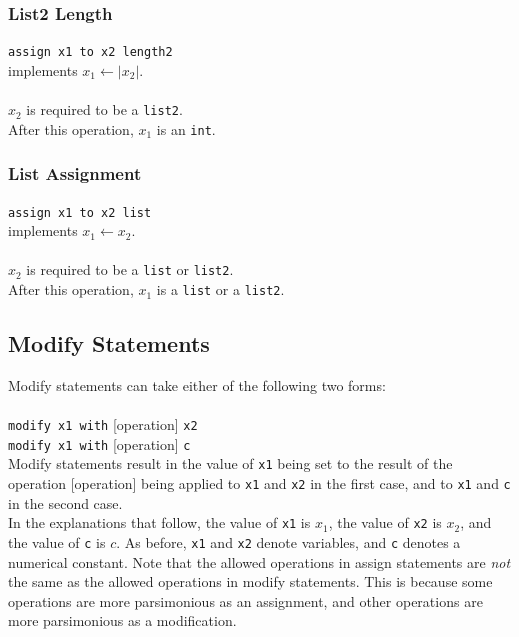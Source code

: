 \documentclass[11pt]{report}
\begin{document}
\subsubsection{List2 Length} 

\texttt{assign x1 to x2 length2} \\
implements $x_1 \leftarrow |x_2|$. \\ \\  
$x_2$ is required to be a \texttt{list2}. \\
After this operation, $x_1$ is an \texttt{int}.

\subsubsection{List Assignment}

\texttt{assign x1 to x2 list} \\
implements $x_1 \leftarrow x_2$. \\ \\  
$x_2$ is required to be a \texttt{list} or \texttt{list2}. \\
After this operation, $x_1$ is a \texttt{list} or a \texttt{list2}.

\subsection{Modify Statements}

Modify statements can take either of the following two forms: \\ \\
\texttt{modify x1 with} [operation] \texttt{x2} \\ 
\texttt{modify x1 with} [operation] \texttt{c} \\

Modify statements result in the value of \texttt{x1} being set to the result of the operation [operation] being applied to \texttt{x1} and \texttt{x2} in the first case, and to \texttt{x1} and \texttt{c} in the second case. \\

In the explanations that follow, the value of \texttt{x1} is $x_1$, the value of \texttt{x2} is $x_2$, and the value of \texttt{c} is $c$. As before, \texttt{x1} and \texttt{x2} denote variables, and \texttt{c} denotes a numerical constant. Note that the allowed operations in assign statements are \emph{not} the same as the allowed operations in modify statements. This is because some operations are more parsimonious as an assignment, and other operations are more parsimonious as a modification.
\end{document}

